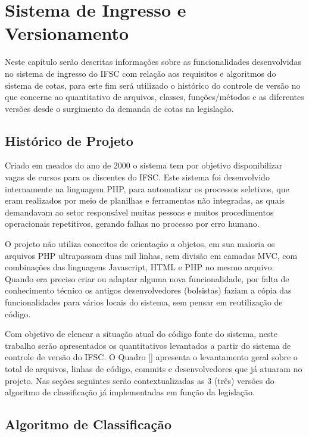 \chapter{Sistema de Ingresso e Versionamento}
\label{historicoversoes}

Neste capítulo serão descritas informações sobre as funcionalidades desenvolvidas no sistema de ingresso do \gls{IFSC} com relação aos requisitos e algoritmos do sistema de cotas, para este fim será utilizado o histórico do controle de versão no que concerne ao quantitativo de arquivos, classes, funções/métodos e as diferentes versões desde o surgimento da demanda de cotas na legislação.

\section{Histórico de Projeto}
\label{historicopj}
Criado em meados do ano de 2000 o sistema tem por objetivo disponibilizar vagas de cursos para os discentes do \gls{IFSC}. Este sistema foi desenvolvido internamente na linguagem PHP, para automatizar os processos seletivos, que eram realizados por meio de planilhas e ferramentas não integradas, as quais demandavam ao setor responsável muitas pessoas e muitos procedimentos operacionais repetitivos, gerando falhas no processo por erro humano.

O projeto não utiliza conceitos de orientação a objetos, em sua maioria os arquivos PHP ultrapassam duas mil linhas, sem divisão em camadas \gls{MVC}, com combinações das linguagens Javascript, HTML e PHP no mesmo arquivo. Quando era preciso criar ou adaptar alguma nova funcionalidade, por falta de conhecimento técnico os antigos desenvolvedores (bolsistas) faziam a cópia das funcionalidades para vários locais do sistema, sem pensar em reutilização de código.

Com objetivo de elencar a situação atual do código fonte do sistema, neste trabalho serão apresentados os quantitativos levantados a partir do sistema de controle de versão do \gls{IFSC}. O Quadro \ref{} apresenta o levantamento geral sobre o total de arquivos, linhas de código, commits e desenvolvedores que já atuaram no projeto. Nas seções seguintes serão contextualizadas as 3 (três) versões do algoritmo de classificação já implementadas em função da legislação.

\section{Algoritmo de Classificação}
\label{algoritimodeclassificacao}

